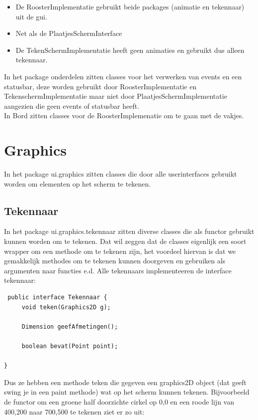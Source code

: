 \documentclass[a4paper,10pt]{article}
\begin{document}
\begin{itemize}
 \item De RoosterImplementatie gebruikt beide packages (animatie en tekennaar) uit de gui.
\item Net als de PlaatjesSchermInterface
\item De TekenSchermImplementatie heeft geen animaties en gebruikt dus alleen tekennaar.
\end{itemize}

In het package onderdelen zitten classes voor het verwerken van events en een statusbar, deze worden gebruikt door RoosterImplementatie en TekenschermImplementatie maar niet door PlaatjesSchermImplementatie aangezien die geen events of statusbar heeft.\\

In Bord zitten classes voor de RoosterImplemenatie om te gaan met de vakjes.


\section{Graphics}

In het package ui.graphics zitten classes die door alle userinterfaces gebruikt worden om elementen op het scherm te tekenen.

\subsection{Tekennaar}

In het package ui.graphics.tekennaar zitten diverse classes die als functor gebruikt kunnen worden om te tekenen. Dat wil zeggen dat de classes eigenlijk een soort wrapper om een methode om te tekenen zijn, het voordeel hiervan is dat we gemakkelijk methodes om te tekenen kunnen doorgeven en gebruiken als argumenten naar functies e.d. Alle tekennaars implementeeren de interface tekennaar:

\begin{verbatim}
 public interface Tekennaar {
     void teken(Graphics2D g);
     
     Dimension geefAfmetingen();
     
     boolean bevat(Point point);
     
}
\end{verbatim}


Dus ze hebben een methode teken die gegeven een graphics2D object (dat geeft swing je in een paint methode) wat op het scherm kunnen tekenen. Bijvoorbeeld de functor om een groene half doorzichte cirkel op 0,0 en een roode lijn van 400,200 naar 700,500 te tekenen ziet er zo uit:
\end{document}
